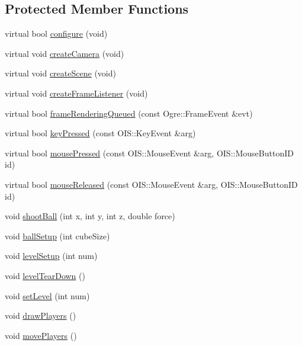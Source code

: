 \subsection*{Protected Member Functions}
\begin{DoxyCompactItemize}
\item 
virtual bool \hyperlink{classTileGame_a460265525565530c2d5d448a4f10cce1}{configure} (void)
\item 
virtual void \hyperlink{classTileGame_af68126fe7750735a9d3850f11cf93354}{create\-Camera} (void)
\item 
virtual void \hyperlink{classTileGame_a7a58cee3d3b0f06d80da0b06bae68347}{create\-Scene} (void)
\item 
virtual void \hyperlink{classTileGame_a8e62f0508c93131c11ed08e0adbedfbb}{create\-Frame\-Listener} (void)
\item 
virtual bool \hyperlink{classTileGame_abfa3b829a661de02f3f4bf2d8102bd49}{frame\-Rendering\-Queued} (const Ogre\-::\-Frame\-Event \&evt)
\item 
virtual bool \hyperlink{classTileGame_af96355c8ea5a968b5ceb5090ea4e811e}{key\-Pressed} (const O\-I\-S\-::\-Key\-Event \&arg)
\item 
virtual bool \hyperlink{classTileGame_a1826b5a7db94eb11037a46c5d57dfc4f}{mouse\-Pressed} (const O\-I\-S\-::\-Mouse\-Event \&arg, O\-I\-S\-::\-Mouse\-Button\-I\-D id)
\item 
virtual bool \hyperlink{classTileGame_ab7a0cbe5c9d1f41fa3b16486437511e4}{mouse\-Released} (const O\-I\-S\-::\-Mouse\-Event \&arg, O\-I\-S\-::\-Mouse\-Button\-I\-D id)
\item 
void \hyperlink{classTileGame_a08e86412abbd596046bc2e9399dc9da8}{shoot\-Ball} (int x, int y, int z, double force)
\item 
void \hyperlink{classTileGame_a512ac0031cfe85e79ca0a53582492240}{ball\-Setup} (int cube\-Size)
\item 
void \hyperlink{classTileGame_a1da6c5e8d396ebdfe05c2eedf28a2ca8}{level\-Setup} (int num)
\item 
void \hyperlink{classTileGame_a55045a99dda1545c4043ab6da75d2432}{level\-Tear\-Down} ()
\item 
void \hyperlink{classTileGame_ab59731a2c682beeda91ad1a89229a3f0}{set\-Level} (int num)
\item 
void \hyperlink{classTileGame_a32cb315499ee2a035e40a7d3d31cef7d}{draw\-Players} ()
\item 
void \hyperlink{classTileGame_aefafb6c06288a4decb2e13e3af183b9f}{move\-Players} ()
\item 

\end{DoxyCompactItemize}
